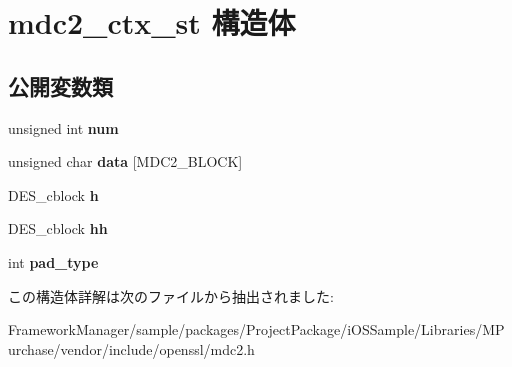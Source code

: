 \hypertarget{structmdc2__ctx__st}{}\section{mdc2\+\_\+ctx\+\_\+st 構造体}
\label{structmdc2__ctx__st}
\subsection*{公開変数類}
\begin{DoxyCompactItemize}
\item 
\hypertarget{structmdc2__ctx__st_af85d040e72cfb4508023fb0ea68fcd77}{}unsigned int {\bfseries num}\label{structmdc2__ctx__st_af85d040e72cfb4508023fb0ea68fcd77}

\item 
\hypertarget{structmdc2__ctx__st_a22f4408c4f13d5e2f7669cd58eca2026}{}unsigned char {\bfseries data} \mbox{[}M\+D\+C2\+\_\+\+B\+L\+O\+C\+K\mbox{]}\label{structmdc2__ctx__st_a22f4408c4f13d5e2f7669cd58eca2026}

\item 
\hypertarget{structmdc2__ctx__st_affcbad02a87a1e029e62afafc4d587de}{}D\+E\+S\+\_\+cblock {\bfseries h}\label{structmdc2__ctx__st_affcbad02a87a1e029e62afafc4d587de}

\item 
\hypertarget{structmdc2__ctx__st_afd6b835d0ca4e70e3b046bd88c10aa8b}{}D\+E\+S\+\_\+cblock {\bfseries hh}\label{structmdc2__ctx__st_afd6b835d0ca4e70e3b046bd88c10aa8b}

\item 
\hypertarget{structmdc2__ctx__st_a98ad50463fcdc70534875520374dd08d}{}int {\bfseries pad\+\_\+type}\label{structmdc2__ctx__st_a98ad50463fcdc70534875520374dd08d}

\end{DoxyCompactItemize}


この構造体詳解は次のファイルから抽出されました\+:\begin{DoxyCompactItemize}
\item 
Framework\+Manager/sample/packages/\+Project\+Package/i\+O\+S\+Sample/\+Libraries/\+M\+Purchase/vendor/include/openssl/mdc2.\+h\end{DoxyCompactItemize}
